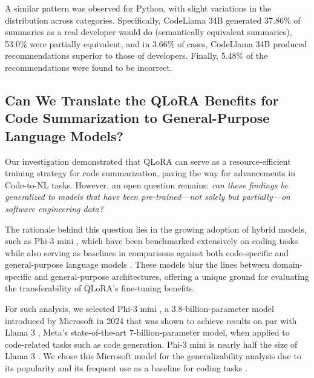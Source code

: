 A similar pattern was observed for Python, with slight variations in the distribution across categories. Specifically, CodeLlama 34B generated 37.86\% of summaries as a real developer would do (\ie semantically equivalent summaries), 53.0\% were partially equivalent, and in 3.66\% of cases, CodeLlama 34B produced recommendations superior to those of developers. Finally, 5.48\% of the recommendations were found to be incorrect.


\subsection{Can We Translate the QLoRA Benefits for Code Summarization to General-Purpose Language Models?}
\label{sub:phi3}

Our investigation demonstrated that QLoRA can serve as a resource-efficient training strategy for code summarization, paving the way for advancements in Code-to-NL tasks. However, an open question remains: \emph{can these findings be generalized to models that have been pre-trained—not solely but partially—on software engineering data?}

The rationale behind this question lies in the growing adoption of hybrid models, such as Phi-3 mini \cite{abdin2024phi}, which have been benchmarked extensively on coding tasks while also serving as baselines in comparisons against both code-specific and general-purpose language models \cite{deng2024assessing}. These models blur the lines between domain-specific and general-purpose architectures, offering a unique ground for evaluating the transferability of QLoRA's fine-tuning benefits.

For such analysis, we selected Phi-3 mini \cite{abdin2024phi}, a 3.8-billion-parameter model introduced by Microsoft in 2024 that was shown to achieve results on par with Llama 3 \cite{dubey2024llama}, Meta’s state-of-the-art 7-billion-parameter model, when applied to code-related tasks such as code generation. Phi-3 mini is nearly half the size of Llama 3 \cite{dubey2024llama}. We chose this Microsoft model for the generalizability analysis due to its popularity  and its frequent use as a baseline for coding tasks \cite{deng2024assessing, peixoto2024effectiveness}. 




